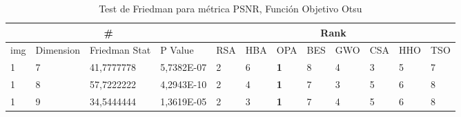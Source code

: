 \documentclass[conference]{IEEEtran}
\begin{document}
\begin{table}[]
	\centering
	\caption{Test de Friedman para métrica PSNR, Función Objetivo Otsu}
	\begin{tabular}{|llll|llllllll|}
		\hline
		\multicolumn{4}{|c|}{\#} & \multicolumn{8}{c|}{Rank} \\ \hline
		\multicolumn{1}{|l|}{img} & \multicolumn{1}{l|}{Dimension} & \multicolumn{1}{l|}{Friedman Stat} & P Value & \multicolumn{1}{l|}{RSA} & \multicolumn{1}{l|}{HBA} & \multicolumn{1}{l|}{OPA} & \multicolumn{1}{l|}{BES} & \multicolumn{1}{l|}{GWO} & \multicolumn{1}{l|}{CSA} & \multicolumn{1}{l|}{HHO} & TSO \\ \hline 
\multicolumn{1}{|l|}{1}                                                     & \multicolumn{1}{l|}{7}                                                        & \multicolumn{1}{l|}{41,7777778}                                                   & 5,7382E-07                     & \multicolumn{1}{l|}{2}                                                  & \multicolumn{1}{l|}{6}                                                  & \multicolumn{1}{l|}{\textbf{1}}                                         & \multicolumn{1}{l|}{8}                                                  & \multicolumn{1}{l|}{4}                                                  & \multicolumn{1}{l|}{3}                                                  & \multicolumn{1}{l|}{5}                                                  & 7                          \\ \hline
\multicolumn{1}{|l|}{1}                                                     & \multicolumn{1}{l|}{8}                                                        & \multicolumn{1}{l|}{57,7222222}                                                   & 4,2943E-10                     & \multicolumn{1}{l|}{2}                                                  & \multicolumn{1}{l|}{4}                                                  & \multicolumn{1}{l|}{\textbf{1}}                                         & \multicolumn{1}{l|}{7}                                                  & \multicolumn{1}{l|}{3}                                                  & \multicolumn{1}{l|}{5}                                                  & \multicolumn{1}{l|}{6}                                                  & 8                          \\ \hline
\multicolumn{1}{|l|}{1}                                                     & \multicolumn{1}{l|}{9}                                                        & \multicolumn{1}{l|}{34,5444444}                                                   & 1,3619E-05                     & \multicolumn{1}{l|}{2}                                                  & \multicolumn{1}{l|}{3}                                                  & \multicolumn{1}{l|}{\textbf{1}}                                         & \multicolumn{1}{l|}{7}                                                  & \multicolumn{1}{l|}{4}                                                  & \multicolumn{1}{l|}{5}                                                  & \multicolumn{1}{l|}{6}                                                  & 8                          \\ \hline

\end{tabular}
\end{table}
\end{document}

